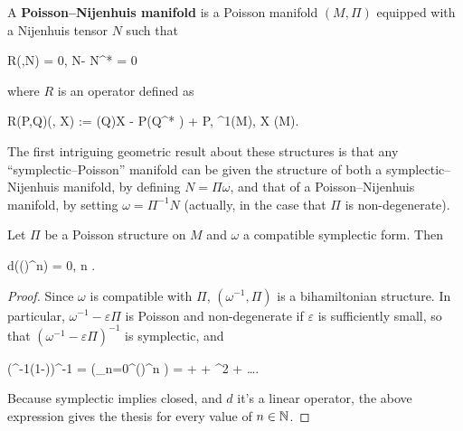 \documentclass[main.tex]{subfiles}
\begin{document}
\begin{definition}
	A \textbf{Poisson--Nijenhuis manifold} is a Poisson manifold $(M,\Pi)$ equipped with a Nijenhuis tensor $N$ such that
	\begin{eqalign}
	\label{eq:poisson_nijenhuis_conditions}
		R(\Pi,N) = 0, \quad N\Pi - \Pi N^* = 0
	\end{eqalign}
	where $R$ is an operator defined as
	\begin{eqalign}
		R(P,Q)(\alpha, X) := (Q)X - P(Q^* \alpha) + P\alpha, \quad \alpha \in \Omega^1(M), X \in \fields(M).
	\end{eqalign}
\end{definition}

The first intriguing geometric result about these structures is that any ``symplectic--Poisson'' manifold can be given the structure of both a symplectic--Nijenhuis manifold, by defining $N=\Pi\omega$, and that of a Poisson--Nijenhuis manifold, by setting $\omega = \Pi^{-1}N$ (actually, in the case that $\Pi$ is non-degenerate).

\begin{lemma}
\label{lemma:powers_of_comp_are_closed}
	Let $\Pi$ be a Poisson structure on $M$ and $\omega$ a compatible symplectic form. Then
	\begin{eqalign}
		d(\omega(\Pi \omega)^n) = 0, \quad \forall n \in \N.
	\end{eqalign}
\end{lemma}
\begin{proof}
	Since $\omega$ is compatible with $\Pi$, $(\omega^{-1}, \Pi)$ is a bihamiltonian structure. In particular, $\omega^{-1}-\varepsilon \Pi$ is Poisson and non-degenerate if $\varepsilon$ is sufficiently small, so that $(\omega^{-1}-\varepsilon \Pi)^{-1}$ is symplectic, and
	\begin{eqalign}
		(\omega^{-1}(1-\varepsilon \omega \Pi))^{-1} = \left(\sum_{n=0}^\infty (\varepsilon \omega \Pi)^n \right) \omega = \omega + \varepsilon \omega \Pi \omega + \varepsilon^2 \omega \Pi \omega \Pi \omega + \ldots.
	\end{eqalign}
	Because symplectic implies closed, and $d$ it's a linear operator, the above expression gives the thesis for every value of $n \in \mathbb{N}$.
\end{proof}
\end{document}
